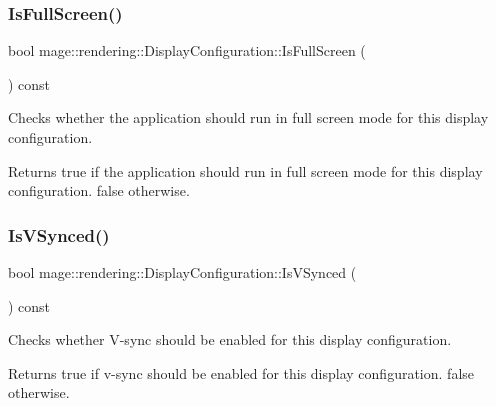 \subsubsection{\texorpdfstring{Is\+Full\+Screen()}{IsFullScreen()}}
{\footnotesize\ttfamily bool mage\+::rendering\+::\+Display\+Configuration\+::\+Is\+Full\+Screen (\begin{DoxyParamCaption}{ }\end{DoxyParamCaption}) const\hspace{0.3cm}{\ttfamily [noexcept]}}

Checks whether the application should run in full screen mode for this display configuration.

\begin{DoxyReturn}{Returns}
{\ttfamily true} if the application should run in full screen mode for this display configuration. {\ttfamily false} otherwise. 
\end{DoxyReturn}
\hypertarget{classmage_1_1rendering_1_1_display_configuration_a6447404f1d720b98b37f684ba0e790a0}{}\label{classmage_1_1rendering_1_1_display_configuration_a6447404f1d720b98b37f684ba0e790a0} 
\subsubsection{\texorpdfstring{Is\+V\+Synced()}{IsVSynced()}}
{\footnotesize\ttfamily bool mage\+::rendering\+::\+Display\+Configuration\+::\+Is\+V\+Synced (\begin{DoxyParamCaption}{ }\end{DoxyParamCaption}) const\hspace{0.3cm}{\ttfamily [noexcept]}}

Checks whether V-\/sync should be enabled for this display configuration.

\begin{DoxyReturn}{Returns}
{\ttfamily true} if v-\/sync should be enabled for this display configuration. {\ttfamily false} otherwise. 
\end{DoxyReturn}
\hypertarget{classmage_1_1rendering_1_1_display_configuration_acbe793e625311707e234fcd0977978d5}{}\label{classmage_1_1rendering_1_1_display_configuration_acbe793e625311707e234fcd0977978d5} 

